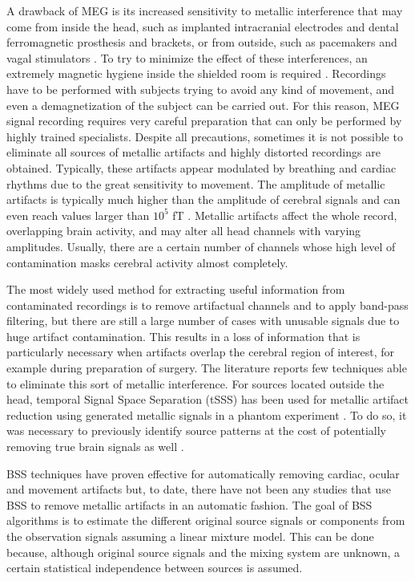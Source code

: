 A drawback of MEG is its increased sensitivity to metallic interference that may come from inside the head, such as implanted intracranial electrodes and dental ferromagnetic prosthesis and brackets, or from outside, such as pacemakers and vagal stimulators \citep{Vrba2002}. To try to minimize the effect of these interferences, an extremely magnetic hygiene inside the shielded room is required \citep{Hillebrand2013}. Recordings have to be performed with subjects trying to avoid any kind of movement, and even a demagnetization of the subject can be carried out. For this reason, MEG signal recording requires very careful preparation that can only be performed by highly trained specialists. Despite all precautions, sometimes it is not possible to eliminate all sources of metallic artifacts and highly distorted recordings are obtained. Typically, these artifacts appear modulated by breathing and cardiac rhythms \citep{Hillebrand2013} due to the great sensitivity to movement. The amplitude of metallic artifacts is typically much higher than the amplitude of cerebral signals and can even reach values larger than $10^5$ fT \citep{Cheyne2007}. Metallic artifacts affect the whole record, overlapping brain activity, and may alter all head channels with varying amplitudes. Usually, there are a certain number of channels whose high level of contamination masks cerebral activity almost completely.

The most widely used method for extracting useful information from contaminated recordings is to remove artifactual channels and to apply band-pass filtering, but there are still a large number of cases with unusable signals due to huge artifact contamination. This results in a loss of information that is particularly necessary when artifacts overlap the cerebral region of interest, for example during preparation of surgery. The literature reports few techniques able to eliminate this sort of metallic interference. For sources located outside the head, temporal Signal Space Separation (tSSS) has been used for metallic artifact reduction using generated metallic signals in a phantom experiment \citep{Taulu2006}. To do so, it was necessary to previously identify source patterns at the cost of potentially removing true brain signals as well \citep{Medvedovsky2009}.

BSS techniques have proven effective for automatically removing cardiac, ocular and movement artifacts \citep{Escudero2007,Mantini2008}  but, to date, there have not been any studies that use BSS to remove metallic artifacts in an automatic fashion. The goal of BSS algorithms is to estimate the different original source signals or components from the observation signals assuming a linear mixture model. This can be done because, although original source signals and the mixing system are unknown, a certain statistical independence between sources is assumed.

